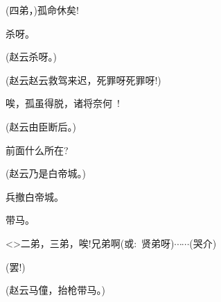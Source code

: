 {(四弟，)孤命休矣!

杀呀。

(赵云\hspace{30pt}杀呀。)

(赵云\hspace{30pt}赵云救驾来迟，死罪呀死罪呀!)

唉，孤虽得脱，诸将奈何~!

(赵云\hspace{30pt}由臣断后。)

前面什么所在?

(赵云\hspace{30pt}乃是白帝城。)

兵撤白帝城。

带马。

\textless{}\!\textgreater{}二弟，三弟，唉!兄弟啊({\akai 或}:~贤弟呀)$\cdots{}\cdots{}$({\hwfs 哭介})

(罢!)

(赵云\hspace{30pt}马僮，抬枪带马。)

}
